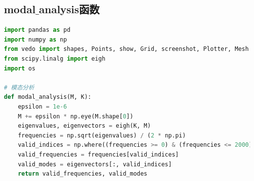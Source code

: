\documentclass[withoutpreface,bwprint]{cumcmthesis} %
\begin{document}
\begin{appendices}
\section{modal$\_$analysis函数}
\begin{lstlisting}[language=Python]
import pandas as pd
import numpy as np
from vedo import shapes, Points, show, Grid, screenshot, Plotter, Mesh
from scipy.linalg import eigh
import os

# 模态分析
def modal_analysis(M, K):
    epsilon = 1e-6
    M += epsilon * np.eye(M.shape[0])
    eigenvalues, eigenvectors = eigh(K, M)
    frequencies = np.sqrt(eigenvalues) / (2 * np.pi)
    valid_indices = np.where((frequencies >= 0) & (frequencies <= 2000))[0]
    valid_frequencies = frequencies[valid_indices]
    valid_modes = eigenvectors[:, valid_indices]
    return valid_frequencies, valid_modes
\end{lstlisting}

\end{appendices}
\end{document}
